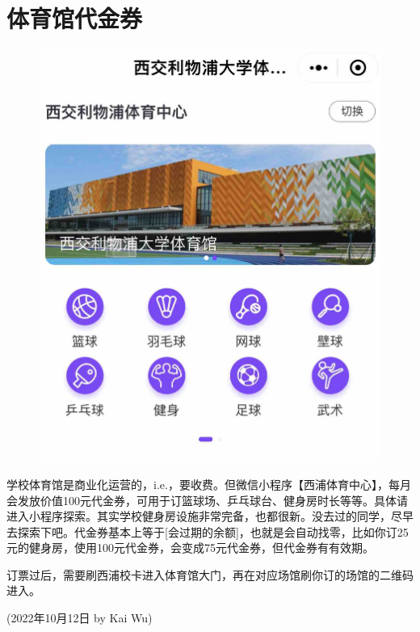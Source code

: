 \section{体育馆代金券}
\begin{figure}[H]
    \centering
    \includegraphics[width=0.4\columnwidth]{author-folder/Kai.Wu/sportcenter_miniprogram.jpg}
\end{figure}
学校体育馆是商业化运营的，i.e.，要收费。但微信小程序【西浦体育中心】，每月会发放价值100元代金券，可用于订篮球场、乒乓球台、健身房时长等等。具体请进入小程序探索。其实学校健身房设施非常完备，也都很新。没去过的同学，尽早去探索下吧。代金券基本上等于[会过期的余额]，也就是会自动找零，比如你订25元的健身房，使用100元代金券，会变成75元代金券，但代金券有有效期。

订票过后，需要刷西浦校卡进入体育馆大门，再在对应场馆刷你订的场馆的二维码进入。

\begin{flushright}
(2022年10月12日 by Kai Wu)
\end{flushright}